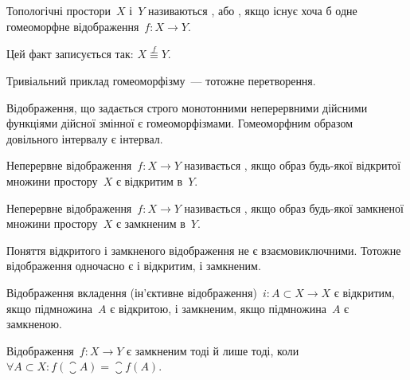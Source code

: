 \begin{definition}
    Топологічні простори~$X$ і~$Y$ називаються , або , якщо існує хоча б одне гомеоморфне відображення~$f: X \to Y$.
\end{definition}

Цей факт записується так: $X \overset{f}{\equiv} Y$.

\begin{example}
    Тривіальний приклад гомеоморфізму~--- тотожне перетворення.
\end{example}

\begin{example}
    Відображення, що задається строго монотонними неперервними дійсними функціями дійсної змінної є гомеоморфізмами. Гомеоморфним образом довільного інтервалу є інтервал.
\end{example}

\begin{definition}
    Неперервне відображення~$f: X \to Y$ називається , якщо образ будь-якої відкритої множини простору~$X$ є відкритим в~$Y$.
\end{definition}

\begin{definition}
    Неперервне відображення~$f: X \to Y$ називається , якщо образ будь-якої замкненої множини простору~$X$ є замкненим в~$Y$.
\end{definition}

\begin{remark}
    Поняття відкритого і замкненого відображення не є взаємовиключними. Тотожне відображення одночасно є і відкритим, і замкненим.
\end{remark}

\begin{example}
    Відображення вкладення (ін'єктивне відображення)~$i: A \subset X \to X$ є відкритим, якщо підмножина~$A$ є відкритою, і замкненим, якщо підмножина~$A$ є замкненою.
\end{example}

\begin{theorem}
    Відображення~$f: X \to Y$ є замкненим тоді й лише тоді, коли~$\forall A \subset X: f(\closure{A}) = \closure{f(A)}$.
\end{theorem}

